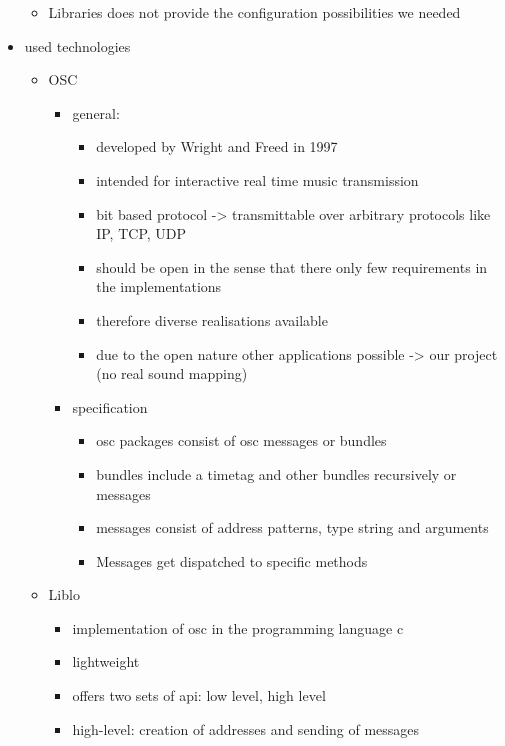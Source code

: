 \documentclass[conference]{acmsiggraph}
\begin{document}
\begin{itemize}
{\begin{itemize}
{{\begin{itemize}
{\begin{itemize}
							\item Libraries does not provide the configuration possibilities we needed
						\end{itemize}
					}
				\end{itemize}
			}
		}
	\end{itemize}
}
\item{
	used technologies
	\begin{itemize}
	\item{
		OSC
		\begin{itemize}
			\item{
				general:
				\begin{itemize}
					\item developed by Wright and Freed in 1997 \cite{Wright97Open}
					\item intended for interactive real time music transmission
					\item bit based protocol -> transmittable over arbitrary protocols like IP, TCP, UDP
					\item should be open in the sense that there only few requirements in the implementations
					\item therefore diverse realisations available
					\item due to the open nature other applications possible -> our project (no real sound mapping) \cite{Wright05Open}
				\end{itemize}
			}
			\item{
				specification \cite{Wright02Open}
				\begin{itemize}
					\item osc packages consist of osc messages or bundles
					\item bundles include a timetag and other bundles recursively or messages
					\item messages consist of address patterns, type string and arguments
					\item Messages get dispatched to specific methods
				\end{itemize}
			}
		\end{itemize}
	}
	\item{
		Liblo
		\begin{itemize}
			\item implementation of osc in the programming language c \cite{Harris07liblo}
			\item lightweight
			\item offers two sets of api: low level, high level
			\item high-level: creation of addresses and sending of messages

\end{itemize}}
\end{itemize}}
\end{itemize}
\end{document}
